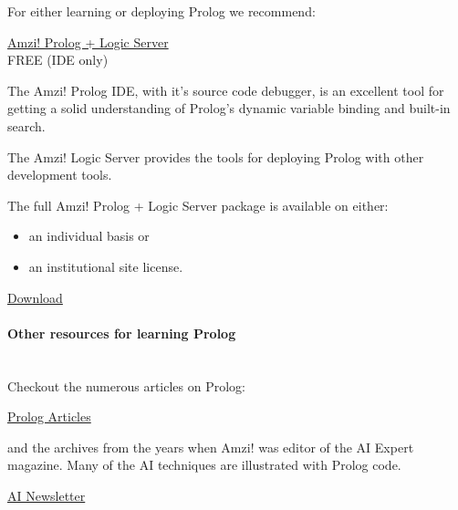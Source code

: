 
For either learning or deploying Prolog we recommend:

\bigskip
\href{http://www.amzi.com/AmziPrologLogicServer/index.php}{Amzi! Prolog + Logic
Server}\\
FREE (IDE only)
\bigskip

The Amzi! Prolog IDE, with it's source code debugger, is an excellent tool for
getting a solid understanding of Prolog's dynamic variable binding and built-in
search.

\bigskip

The Amzi! Logic Server provides the tools for deploying Prolog with other
development tools.

\bigskip

The full Amzi! Prolog + Logic Server package is available on either:

\begin{itemize}[nosep]
  \item an individual basis or
  \item an institutional site license.
\end{itemize}

\bigskip
\href{http://www.amzi.com/AmziPrologLogicServer/store.php}{Download}
\bigskip

\paragraph{Other resources for learning Prolog}\ \\

Checkout the numerous articles on Prolog:

\bigskip
\href{http://www.amzi.com/articles/index.htm}{Prolog Articles}
\bigskip

\noindent and the archives from the years when Amzi! was editor of the AI Expert
magazine. Many of the AI techniques are illustrated with Prolog code.

\bigskip
\href{http://www.ainewsletter.com/}{AI Newsletter}